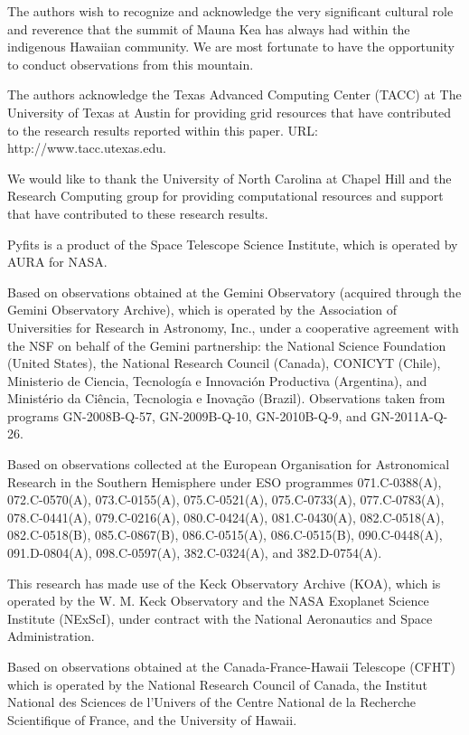 \documentclass[twocolumn]{aastex62}
\begin{document}
The authors wish to recognize and acknowledge the very significant cultural role and reverence that the summit of Mauna Kea has always had within the indigenous Hawaiian community. We are most fortunate to have the opportunity to conduct observations from this mountain.

The authors acknowledge the Texas Advanced Computing Center (TACC) at The University of Texas at Austin for providing grid resources that have contributed to the research results reported within this paper. URL: http://www.tacc.utexas.edu.

We would like to thank the University of North Carolina at Chapel Hill and the Research Computing group for providing computational resources and support that have contributed to these research results.

Pyfits is a product of the Space Telescope Science Institute, which is operated by AURA for NASA.

Based on observations obtained at the Gemini Observatory (acquired through the Gemini Observatory Archive), which is operated by the Association of Universities for Research in Astronomy, Inc., under a cooperative agreement with the NSF on behalf of the Gemini partnership: the National Science Foundation (United States), the National Research Council (Canada), CONICYT (Chile), Ministerio de Ciencia, Tecnolog\'{i}a e Innovaci\'{o}n Productiva (Argentina), and Minist\'{e}rio da Ci\^{e}ncia, Tecnologia e Inova\c{c}\~{a}o (Brazil). Observations taken from programs GN-2008B-Q-57, GN-2009B-Q-10, GN-2010B-Q-9, and GN-2011A-Q-26.

Based on observations collected at the European Organisation for Astronomical Research in the Southern Hemisphere under ESO programmes 071.C-0388(A), 072.C-0570(A), 073.C-0155(A), 075.C-0521(A), 075.C-0733(A), 077.C-0783(A), 078.C-0441(A), 079.C-0216(A), 080.C-0424(A), 081.C-0430(A), 082.C-0518(A), 082.C-0518(B), 085.C-0867(B), 086.C-0515(A), 086.C-0515(B), 090.C-0448(A), 091.D-0804(A), 098.C-0597(A), 382.C-0324(A), and 382.D-0754(A).

 This research has made use of the Keck Observatory Archive (KOA), which is operated by the W. M. Keck Observatory and the NASA Exoplanet Science Institute (NExScI), under contract with the National Aeronautics and Space Administration. 

Based on observations obtained at the Canada-France-Hawaii Telescope (CFHT) which is operated by the National Research Council of Canada, the Institut National des Sciences de l'Univers of the Centre National de la Recherche Scientifique of France, and the University of Hawaii. 
\end{document}
